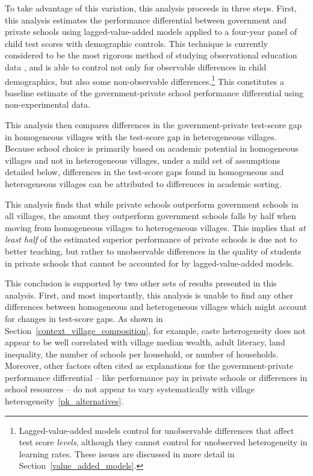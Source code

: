 \documentclass[Eubank_pk_ethnic_sorting.tex]{subfiles}
\begin{document}
To take advantage of this variation, this analysis proceeds in three steps. First, this analysis estimates the performance differential between government and private schools using lagged-value-added models applied to a four-year panel of child test scores with demographic controls. This technique is currently considered to be the most rigorous method of studying observational education data \citep{Gordon:2006wt,McCaffrey:2003vk,Hanushek:2003hz}, and is able to control not only for observable differences in child demographics, but also some non-observable differences.\footnote{Lagged-value-added models control for unobservable differences that affect test score \emph{levels}, although they cannot control for unobserved heterogeneity in learning rates. These issues are discussed in more detail in Section~\ref{value_added_models}.} This constitutes a baseline estimate of the government-private school performance differential using non-experimental data.

This analysis then compares differences in the government-private test-score gap in homogeneous villages with the test-score gap in heterogeneous villages. Because school choice is primarily based on academic potential in homogeneous villages and not in heterogeneous villages, under a mild set of assumptions detailed below, differences in the test-score gaps found in homogeneous and heterogeneous villages can be attributed to differences in academic sorting.

This analysis finds that while private schools outperform government schools in all villages, the amount they outperform government schools falls by half when moving from homogeneous villages to heterogeneous villages. This implies that \emph{at least half} of the estimated superior performance of private schools is due not to better teaching, but rather to unobservable differences in the quality of students in private schools that cannot be accounted for by lagged-value-added models. 

This conclusion is supported by two other sets of results presented in this analysis. First, and most importantly, this analysis is unable to find any other differences between homogeneous and heterogeneous villages which might account for changes in test-score gaps. As shown in Section~\ref{context_village_composition}, for example, caste heterogeneity does not appear to be well correlated with village median wealth, adult literacy, land inequality, the number of schools per household, or number of households. Moreover, other factors often cited as explanations for the government-private performance differential -- like performance pay in private schools or differences in school resources --  do not appear to vary systematically with village heterogeneity~\ref{pk_alternatives}. 
\end{document}
